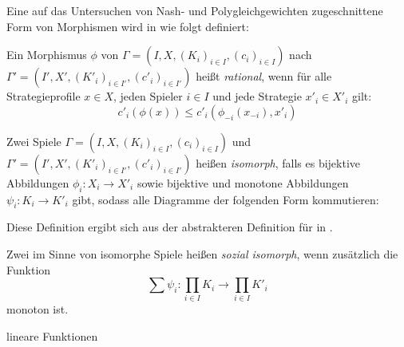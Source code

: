Eine auf das Untersuchen von Nash- und Polygleichgewichten zugeschnittene Form von Morphismen wird in \cite{Polyequilibrium} wie folgt definiert:

\begin{defn}
	Ein Morphismus $\phi$ von $\Gamma = (I, X, (K_i)_{i\in I}, (c_i)_{i\in I})$ nach $\Gamma' = (I', X', (K'_i)_{i\in I'}, (c'_i)_{i\in I'})$ heißt \emph{rational}, wenn für alle Strategieprofile $x \in X$, jeden Spieler $i \in I$ und jede Strategie $x'_i \in X'_i$ gilt:
	\[c'_i(\phi(x)) \leq c'_i(\phi_{-i}(x_{-i}), x'_i) \]
\end{defn}


\begin{defn}\label{def:SpielIsomLap}
	Zwei Spiele $\Gamma = (I, X, (K_i)_{i\in I}, (c_i)_{i\in I})$ und $\Gamma' = (I', X', (K'_i)_{i\in I'}, (c'_i)_{i\in I'})$ heißen \emph{isomorph}, falls es bijektive Abbildungen $\phi_i: X_i \to X'_i$ sowie bijektive und monotone Abbildungen $\psi_i: K_i \to K'_i$ gibt, sodass alle Diagramme der folgenden Form kommutieren:
	
	\begin{center}
	\end{center}
\end{defn}

\begin{bem}\label{bem:LapMorDef}
	Diese Definition ergibt sich aus der abstrakteren Definition für  in \cite{LapGameCat}. 
	
\end{bem}

\begin{defn}
	Zwei im Sinne von  isomorphe Spiele heißen \emph{sozial isomorph}, wenn zusätzlich die Funktion
		\[\sum \psi_i: \prod_{i \in I}K_i \to \prod_{i \in I} K'_i \]
	monoton ist. 
\end{defn}

\begin{bsp}
	lineare Funktionen
\end{bsp}	


